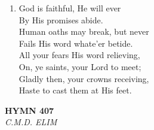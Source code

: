 \documentclass[11pt,a4paper]{article}
\begin{document}
\begin{enumerate}
    \item God is faithful, He will ever \\
        By His promises abide. \\
        Human oaths may break, but never \\
        Fails His word whate'er betide. \\
        All your fears His word relieving, \\
        On, ye saints, your Lord to meet; \\
        Gladly then, your crowns receiving, \\
        Haste to cast them at His feet.

\end{enumerate}

\newpage
\begin{center}
    {\Large \textbf{HYMN 407}}
    \\
    \textit{C.M.D. ELIM}
\end{center}
\vspace{1em}
\end{document}
